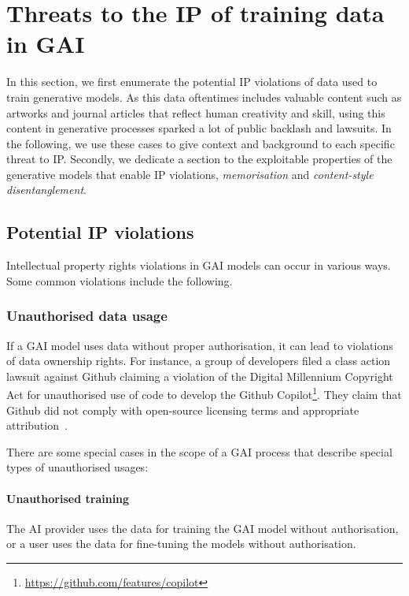 \documentclass[conference,table]{IEEEtran} %
\begin{document}
\section{Threats to the IP of training data in GAI}\label{sec:IPR-threats}
In this section, we first enumerate the potential IP violations of data used to train generative models. 
As this data oftentimes includes valuable content such as artworks and journal articles that reflect human creativity and skill, using this content in generative processes sparked a lot of public backlash and lawsuits. In the following, we use these cases to give context and background to each specific threat to IP. 
Secondly, we dedicate a section to the exploitable properties of the generative models that enable IP violations, \textit{memorisation} and \textit{content-style disentanglement}. %
\subsection{Potential IP violations}
Intellectual property rights violations in GAI models can occur in various ways. Some common violations include the following.

\subsubsection{Unauthorised data usage}
If a GAI model uses data without proper authorisation, it can lead to violations of data ownership rights. For instance, a group of developers filed a class action lawsuit against Github claiming a violation of the Digital Millennium Copyright Act for unauthorised use of code to develop the Github Copilot\footnote{\url{https://github.com/features/copilot}}. They claim that Github did not comply with open-source licensing terms and appropriate attribution~\cite{losio_first_2022}.

There are some special cases in the scope of a GAI process that describe special types of unauthorised usages:
        \paragraph{Unauthorised training} The AI provider uses the data for training the GAI model without authorisation, or a user uses the data for fine-tuning the models without authorisation. %
\end{document}
